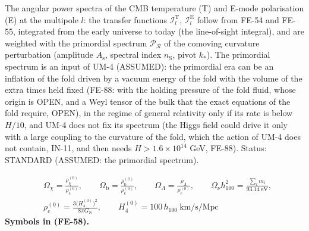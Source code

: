 \documentclass[
  10pt,
]{article}
\begin{document}
The angular power spectra of the CMB temperature (T) and E-mode
polarisation (E) at the multipole \(l\): the transfer functions
\(\mathcal{I}_l^{\mathrm{T}}\), \(\mathcal{I}_l^{\mathrm{E}}\) follow
from FE-54 and FE-55, integrated from the early universe to today (the
line-of-sight integral), and are weighted with the primordial spectrum
\(\mathcal{P}_{\mathcal{R}}\) of the comoving curvature perturbation
(amplitude \(A_{\mathrm{s}}\), spectral index \(n_{\mathrm{S}}\), pivot
\(k_*\)). The primordial spectrum is an input of UM-4 (ASSUMED): the
primordial era can be an inflation of the fold driven by a vacuum energy
of the fold with the volume of the extra times held fixed (FE-88: with
the holding pressure of the fold fluid, whose origin is OPEN, and a Weyl
tensor of the bulk that the exact equations of the fold require, OPEN),
in the regime of general relativity only if its rate is below \(H/10\),
and UM-4 does not fix its spectrum (the Higgs field could drive it only
with a large coupling to the curvature of the fold, which the action of
UM-4 does not contain, IN-11, and then needs \(H > 1.6\times10^{14}\)
GeV, FE-88). Status: STANDARD (ASSUMED: the primordial spectrum).

\[
\begin{aligned}
&\Omega_\chi = \frac{\rho_\chi^{(0)}}{\rho_{\mathrm{c}}^{(0)}},\qquad \Omega_{\mathrm{b}} = \frac{\rho_{\mathrm{b}}^{(0)}}{\rho_{\mathrm{c}}^{(0)}},\qquad
 \Omega_\Lambda = \frac{\rho_\Lambda}{\rho_{\mathrm{c}}^{(0)}},\qquad \Omega_\nu h_{100}^2 = \frac{\sum_im_i}{93.14\ \text{eV}},\\
&\rho_{\mathrm{c}}^{(0)} = \frac{3\big(H_4^{(0)}\big)^2}{8\pi G_{\mathrm{N}}},\qquad H_4^{(0)} = 100\,h_{100}\ \text{km/s/Mpc}
\end{aligned} \tag{FE-58}
\] \textbf{Symbols in (FE-58).}
\end{document}
